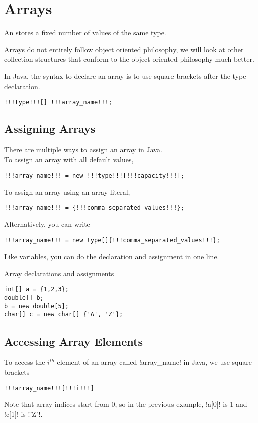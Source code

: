 \documentclass[11pt]{article}
\begin{document}
\section{Arrays}
An  stores a fixed number of values of the same type. 
\begin{note}
    Arrays do not entirely follow object oriented philosophy, we will look at other collection structures that conform to the object oriented philosophy much better.
\end{note}
\noindent In Java, the syntax to declare an array is to use square brackets after the type declaration.
\vspace{-22pt}
\begin{lstlisting}[style=javaSyntax]
!!!type!!![] !!!array_name!!!; 
\end{lstlisting}
\subsection{Assigning Arrays}
There are multiple ways to assign an array in Java. 
\vspace{5pt} \\ To assign an array with all default values,
\vspace{-22pt}
\begin{lstlisting}[style=javaSyntax]
!!!array_name!!! = new !!!type!!![!!!capacity!!!]; 
\end{lstlisting}
To assign an array using an array literal,
\vspace{-22pt}
\begin{lstlisting}[style=javaSyntax]
!!!array_name!!! = {!!!comma_separated_values!!!}; 
\end{lstlisting}
Alternatively, you can write
\vspace{-22pt}
\begin{lstlisting}[style=javaSyntax]
!!!array_name!!! = new type[]{!!!comma_separated_values!!!}; 
\end{lstlisting}
Like variables, you can do the declaration and assignment in one line.
\begin{egs} Array declarations and assignments
\vspace{-15pt}
\begin{lstlisting}
int[] a = {1,2,3};
double[] b;
b = new double[5];
char[] c = new char[] {'A', 'Z'};
\end{lstlisting}
\end{egs}
\subsection{Accessing Array Elements}
To access the $i^{th}$ element of an array called \inlineJava!array_name! in Java, we use square brackets
\vspace{-20pt}
\begin{lstlisting}[style=javaSyntax]
!!!array_name!!![!!!i!!!]
\end{lstlisting}
Note that array indices start from 0, so in the previous example, \inlineJava!a[0]! is 1 and \inlineJava!c[1]! is \inlineJava!'Z'!.
\end{document}
